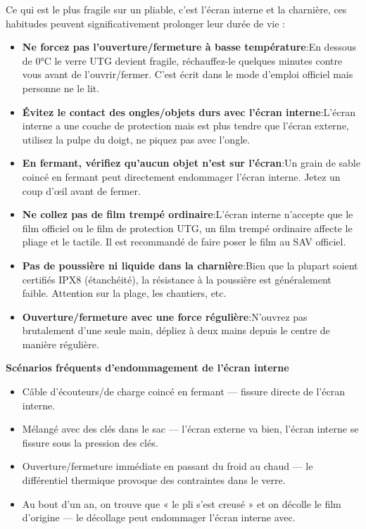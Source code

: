 
Ce qui est le plus fragile sur un pliable, c'est l'écran interne et la charnière, ces habitudes peuvent significativement prolonger leur durée de vie :

\begin{itemize}
  \item \textbf{Ne forcez pas l’ouverture/fermeture à basse température}:En dessous de 0°C le verre UTG devient fragile, réchauffez-le quelques minutes contre vous avant de l’ouvrir/fermer. C’est écrit dans le mode d’emploi officiel mais personne ne le lit.
  \item \textbf{Évitez le contact des ongles/objets durs avec l’écran interne}:L’écran interne a une couche de protection mais est plus tendre que l’écran externe, utilisez la pulpe du doigt, ne piquez pas avec l’ongle.
  \item \textbf{En fermant, vérifiez qu’aucun objet n’est sur l’écran}:Un grain de sable coincé en fermant peut directement endommager l’écran interne. Jetez un coup d’œil avant de fermer.
  \item \textbf{Ne collez pas de film trempé ordinaire}:L’écran interne n’accepte que le film officiel ou le film de protection UTG, un film trempé ordinaire affecte le pliage et le tactile. Il est recommandé de faire poser le film au SAV officiel.
  \item \textbf{Pas de poussière ni liquide dans la charnière}:Bien que la plupart soient certifiés IPX8 (étanchéité), la résistance à la poussière est généralement faible. Attention sur la plage, les chantiers, etc.
  \item \textbf{Ouverture/fermeture avec une force régulière}:N’ouvrez pas brutalement d’une seule main, dépliez à deux mains depuis le centre de manière régulière.
\end{itemize}

\textbf{Scénarios fréquents d'endommagement de l'écran interne}\par

\begin{itemize}
  \item Câble d'écouteurs/de charge coincé en fermant — fissure directe de l'écran interne.
  \item Mélangé avec des clés dans le sac — l'écran externe va bien, l'écran interne se fissure sous la pression des clés.
  \item Ouverture/fermeture immédiate en passant du froid au chaud — le différentiel thermique provoque des contraintes dans le verre.
  \item Au bout d'un an, on trouve que « le pli s'est creusé » et on décolle le film d'origine — le décollage peut endommager l'écran interne avec.
\end{itemize}


